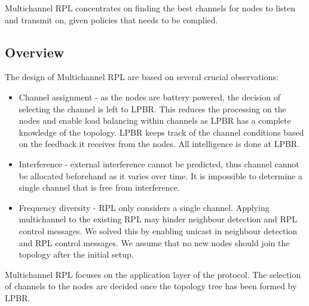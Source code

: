 
Multichannel RPL concentrates on finding the best channels for nodes to listen and transmit on, given policies that needs to be complied. 

\subsection{Overview}


The design of Multichannel RPL are based on several crucial observations:

\begin{itemize}
\item Channel assignment - as the nodes are battery powered, the decision of selecting the channel is left to LPBR. This reduces the processing on the nodes and enable load balancing within channels as LPBR has a complete knowledge of the topology. LPBR keeps track of the channel conditions based on the feedback it receives from the nodes. All intelligence is done at LPBR.

\item Interference - external interference cannot be predicted, thus channel cannot be allocated beforehand as it varies over time. It is impossible to determine a single channel that is free from interference.

\item Frequency diversity - RPL only considers a single channel. Applying multichannel to the existing RPL may hinder neighbour detection and RPL control messages. We solved this by enabling unicast in neighbour detection and RPL control messages. We assume that no new nodes should join the topology after the initial setup.
\end{itemize}

Multichannel RPL focuses on the application layer of the protocol. The selection of channels to the nodes are decided once the topology tree has been formed by LPBR.

